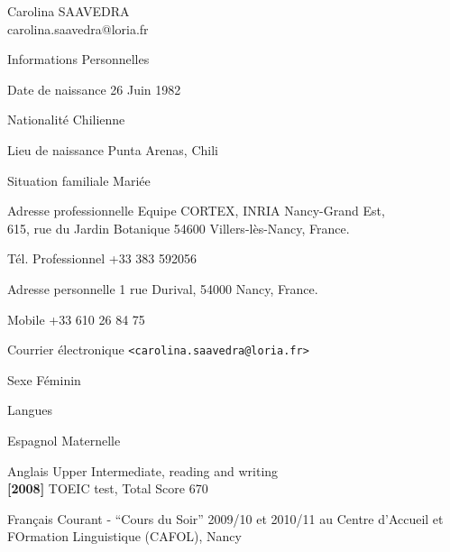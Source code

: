 \documentclass[letterpaper]{article}
\begin{document}
\hfill


%


\setlength{\cvlabelwidth}{45mm}
\begin{cv}{{\huge Carolina SAAVEDRA}\\
carolina.saavedra@loria.fr}

\begin{cvlist}{Informations Personnelles}
\item[Date de naissance] 26 Juin 1982
\item[Nationalité] Chilienne
\item[Lieu de naissance] Punta Arenas, Chili
\item[Situation familiale] Mariée

\item[Adresse professionnelle] Equipe CORTEX, INRIA Nancy-Grand Est,\\
615, rue du Jardin Botanique 54600 Villers-lès-Nancy, France.
\item[Tél. Professionnel] +33 383 592056
\item[Adresse personnelle] 1 rue Durival, 54000 Nancy, France.
\item[Mobile] +33 610 26 84 75
\item[Courrier électronique] \texttt{<carolina.saavedra@loria.fr>}
\item[Sexe] Féminin
\end{cvlist}

\begin{cvlist}{Langues}
\item [Espagnol] Maternelle
\item [Anglais] Upper Intermediate, reading and writing\\
\textbf{[2008]} TOEIC test, Total Score 670
\item [Français] Courant - ``Cours du Soir'' 2009/10 et 2010/11 au Centre d'Accueil et FOrmation Linguistique (CAFOL), Nancy  


\end{cvlist}
\end{cv}
\end{document}
